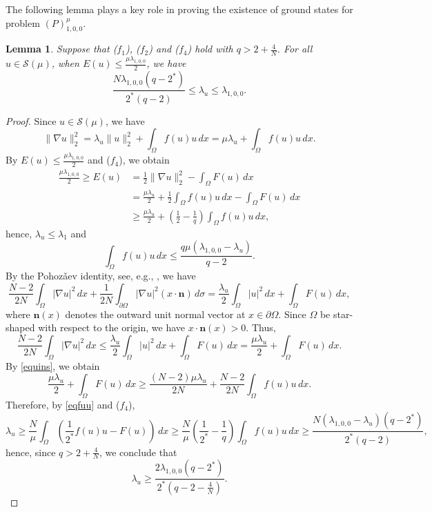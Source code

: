 \documentclass[11pt]{amsart}
\newtheorem{lemma}[theorem]{Lemma}
\newcommand{\abs}[1]{\lvert#1\rvert}
\newcommand{\norm}[1]{\lVert#1\rVert}
\numberwithin{equation}{section}
\begin{document}
The following lemma plays a key role in proving the existence of ground states for problem $(P)^{\mu}_{1,0,0}$.
\begin{lemma}\label{lemlambdau}
Suppose that ($f_1$), ($f_2$) and ($f_4$) hold with $q > 2+\frac{4}{N}$. For all $u \in \mathcal{S}(\mu)$, when $E(u) \leq \frac{\mu\lambda_{1,0,0}}{2}$, we have $$\frac{N\lambda_{1,0,0}(q-2^*)}{2^*(q-2)} \leq \lambda_u \leq \lambda_{1,0,0}.$$
\end{lemma}
\begin{proof}
    Since $u \in \mathcal{S}(\mu)$, we have
    \begin{equation}\label{equins}
            \norm{\nabla u}^2_2=\lambda_u\norm{u}^2_2 + \int_{\Omega}f(u)u\, dx=\mu\lambda_u + \int_{\Omega}f(u)u\, dx.
    \end{equation}
    By $E(u) \leq \frac{\mu\lambda_{1,0,0}}{2}$ and ($f_4$), we obtain
    $$
    \begin{aligned}
            \frac{\mu\lambda_{1,0,0}}{2} \geq E(u)&=\frac{1}{2}\norm{\nabla u}^2_2- \int_{\Omega}F(u)\, dx\\&=\frac{\mu\lambda_u}{2} + \frac{1}{2}\int_{\Omega}f(u)u\, dx- \int_{\Omega}F(u)\, dx \\&\geq \frac{\mu\lambda_u}{2} + (\frac{1}{2}-\frac{1}{q})\int_{\Omega}f(u)u\, dx,
    \end{aligned}
    $$
hence, $\lambda_u \leq \lambda_1$ and
\begin{equation}\label{eqfuu}
    \int_{\Omega}f(u)u\, dx \leq \frac{q\mu  (\lambda_{1,0,0}-\lambda_u)}{q-2}.
\end{equation}
By the Pohoz\v{a}ev identity, see, e.g., \cite[Theorem B.1]{W}, we have
$$
\frac{N-2}{2N} \int_{\Omega}\abs{\nabla u}^2\, dx+ \frac{1}{2N}\int_{\partial\Omega}\abs{\nabla u}^2(x\cdot\bm{n})\, d\sigma = \frac{\lambda_u}{2}\int_{\Omega}\abs{u}^2\, dx + \int_{\Omega}F(u)\, dx,
$$
where $\bm{n}(x)$ denotes the outward unit normal vector at $x \in \partial\Omega$. Since $\Omega$ be star-shaped with respect to the origin, we have $x\cdot \bm{n}(x)>0$. Thus,
$$
\frac{N-2}{2N} \int_{\Omega}\abs{\nabla u}^2\, dx\leq  \frac{\lambda_u}{2}\int_{\Omega}\abs{u}^2\, dx + \int_{\Omega}F(u)\, dx=\frac{\mu\lambda_u}{2} + \int_{\Omega}F(u)\, dx.
$$
By \eqref{equins}, we obtain
$$
\frac{\mu\lambda_u}{2}+  \int_{\Omega}F(u)\, dx \geq \frac{(N-2)\mu\lambda_u}{2N} + \frac{N-2}{2N} \int_{\Omega}f(u)u\, dx.
$$
Therefore, by \eqref{eqfuu} and ($f_4$),
$$
\lambda_u\geq  \frac{N}{\mu}\int_{\Omega}\left(\frac{1}{2^*}f(u)u-F(u)\right)\, dx \geq \frac{N}{\mu}\left(\frac{1}{2^*}-\frac{1}{q}\right)\int_{\Omega}f(u)u\, dx \geq \frac{N(\lambda_{1,0,0}-\lambda_u)(q-2^*)}{2^*(q-2)},
$$
hence, since $q > 2+\frac{4}{N}$, we conclude that
$$
\lambda_u \geq \frac{2\lambda_{1,0,0}(q-2^*)}{2^*(q-2-\frac{4}{N})}.
$$
\end{proof}
\end{document}
